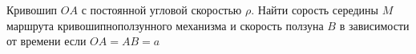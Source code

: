Кривошип $OA$ с постоянной угловой скоростью $\rho$.
Найти сорость середины $M$ маршрута кривошипноползунного механизма
и скорость ползуна $B$ в зависимости от времени если $OA=AB=a$

